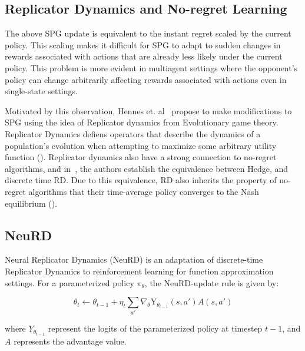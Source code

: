 \subsection{Replicator Dynamics and No-regret Learning}
The above SPG update is equivalent to the instant regret scaled by the current policy.
This scaling makes it difficult for SPG to adapt to sudden changes in rewards associated with
actions that are already less likely under the current policy.
This problem is more evident in multiagent settings where the opponent's policy can change
arbitrarily affecting rewards associated with actions even in single-state settings.

Motivated by this observation, Hennes et.
al~\cite{hennesNeural2020} propose to make modifications
to SPG using the idea of Replicator dynamics from Evolutionary game theory.
Replicator Dynamics defiens operators that describe the dynamics of a population's evolution when
attempting to maximize some arbitrary utility function ().
Replicator dynamics also have a strong connection to no-regret algorithms, and
in~\cite[Statement~1]{hennesNeural2020}, the authors establish the equivalence between Hedge, and
discrete time RD.
Due to this equivalence, RD also inherits the property of no-regret algorithms that their
time-average policy converges to the Nash equilibrium ().

\subsection{NeuRD}
Neural Replicator Dynamics (NeuRD) is an adaptation of discrete-time Replicator Dynamics to
reinforcement learning for function approximation settings.
For a parameterized policy $\pi_\theta$, the NeuRD-update rule is given by:

\begin{equation}
	\label{eqn:nrd} \theta_t \leftarrow \theta_{t-1} + \eta_t \sum_{a'}
	\nabla_{\theta} \text{Y}_{\theta_{t-1}}(s, a') A(s, a')
\end{equation}

where
$Y_{\theta_{t-1}}$ represent the logits of the parameterized policy at timestep $t-1$, and $A$
represents the advantage value.

